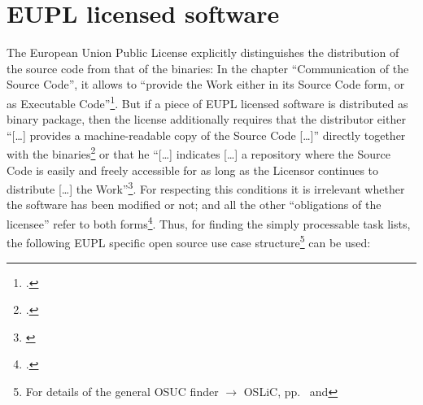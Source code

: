 %
%
%
%
%



\section{EUPL licensed software}

The European Union Public License explicitly distinguishes the distribution
of the source code from that of the binaries: In the chapter
\enquote{Communication of the Source Code}, it allows to \enquote{provide the
Work either in its Source Code form, or as Executable
Code}\footcite[cf.][\nopage wp\ §3]{EuplLicense2007en}. But if a piece of EUPL
licensed software is distributed as binary package, then the license
additionally requires that the distributor either \enquote{[\ldots] provides a
machine-readable copy of the Source Code [\ldots]} directly together with the
binaries\footcite[cf.][\nopage wp\ §5]{EuplLicense2007en} or that he
\enquote{[\ldots] indicates [\ldots] a repository where the Source Code is
easily and freely accessible for as long as the Licensor continues to distribute
[\ldots] the Work}\footnote{\cite[cf.][\nopage wp\ §3.]{EuplLicense2007en}}. For
respecting this conditions it is irrelevant whether the software has been
modified or not; and all the other \enquote{obligations of the licensee} refer
to both forms\footcite[cf.][\nopage wp\ §5]{EuplLicense2007en}. Thus, for
finding the simply processable task lists, the following EUPL specific open
source use case structure\footnote{For details of the general OSUC finder
$\rightarrow$ OSLiC, pp.\ \pageref{OsucTokens} and \pageref{OsucDefinitionTree}}
can be used:
 
